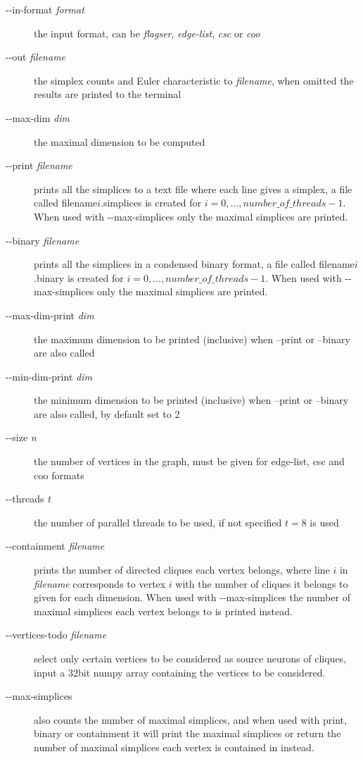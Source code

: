 \documentclass{amsart}
\theoremstyle{definition}
\begin{document}
\enlargethispage{\baselineskip}
\begin{description}
  \item [-{}-in-format \textit{format}] the input format, can be \emph{flagser}, \emph{edge-list}, \emph{csc} or \emph{coo}
  \item [-{}-out \textit{filename}] the simplex counts and Euler characteristic to \textit{filename}, when omitted the results are printed to the terminal
  \item [-{}-max-dim \textit{dim}] the maximal dimension to be computed
  \item [-{}-print \textit{filename}] prints all the simplices to a text file where each line gives a simplex, a file called filename$i$.simplices is created for $i=0,...,number\_of\_threads-1$. When used with -{}-max-simplices only the maximal simplices are printed.
  \item [-{}-binary \textit{filename}] prints all the simplices in a condensed binary format, a file called filename$i$.binary is created for $i=0,...,number\_of\_threads-1$. When used with -{}-max-simplices only the maximal simplices are printed.
  \item [-{}-max-dim-print \textit{dim}] the maximum dimension to be printed (inclusive) when --print or --binary are also called
  \item [-{}-min-dim-print \textit{dim}] the minimum dimension to be printed (inclusive) when --print or --binary are also called, by default set to 2
  \item [-{}-size \textit{n}] the number of vertices in the graph, must be given for edge-list, csc and coo formats
  \item [-{}-threads \textit{t}] the number of parallel threads to be used, if not specified $t=8$ is used
  \item [-{}-containment \textit{filename}] prints the number of directed cliques each vertex belongs, where line $i$ in \textit{filename} corresponds to vertex $i$ with the number of cliques it belongs to given for each dimension. When used with -{}-max-simplices the number of maximal simplices each vertex belongs to is printed instead.
  \item [-{}-vertices-todo \textit{filename}] select only certain vertices to be considered as source neurons of cliques, input a 32bit numpy array containing the vertices to be considered.
  \item [-{}-max-simplices] also counts the number of maximal simplices, and when used with print, binary or containment it will print the maximal simplices or return the number of maximal simplices each vertex is contained in instead.

\end{description}
\end{document}
